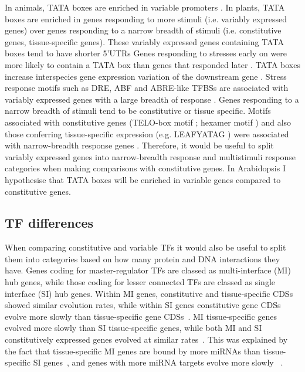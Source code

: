 \documentclass[../main.tex]{subfiles}
\begin{document}
In animals, TATA boxes are enriched in variable promoters \autocite{engstromGenomicRegulatoryBlocks2007,carninciGenomewideAnalysisMammalian2006}.
In plants, TATA boxes are enriched in genes responding to more stimuli (i.e. variably expressed genes) over genes responding to a narrow breadth of stimuli (i.e. constitutive genes, tissue-specific genes).
These variably expressed genes containing TATA boxes tend to have shorter 5'UTRs \autocite{waltherRegulatoryCodeTranscriptional2007,molinaGenomeWideAnalysis2005,lichtenbergWordLandscapeNoncoding2009}
Genes responding to stresses early on were more likely to contain a TATA box than genes that responded later \autocite{waltherRegulatoryCodeTranscriptional2007}.
TATA boxes increase interspecies gene expression variation of the downstream gene \autocite{tiroshGeneticSignatureInterspecies2006}.
Stress response motifs such as DRE, ABF and ABRE-like TFBSs \autocite{yamaguchi-shinozakiNovelCisactingElement1994} are associated with variably expressed genes with a large breadth of response \autocite{waltherRegulatoryCodeTranscriptional2007}.
Genes responding to a narrow breadth of stimuli tend to be constitutive or tissue specific.
Motifs associated with constitutive genes (TELO-box motif \autocite{tremousayguePlantInterstitialTelomere1999}; hexamer motif \autocite{chaubetIdentificationCiselementsRegulating1996}) and also those conferring tissue-specific expression (e.g. LEAFYATAG \autocite{kamiyaIsolationCharacterizationRice2003}) were associated with narrow-breadth response genes \autocite{waltherRegulatoryCodeTranscriptional2007}. Therefore, it would be useful to split variably expressed genes into narrow-breadth response and multistimuli response categories when making comparisons with constitutive genes.
In Arabidopsis I hypothesise that TATA boxes will be enriched in variable genes compared to constitutive genes.

\subsection{TF differences}

When comparing constitutive and variable TFs it would also be useful to split them into categories based on how many protein and DNA interactions they have.
Genes coding for master-regulator TFs are classed as multi\hyp{}interface (MI) hub genes, while those coding for lesser connected TFs are classed as single interface (SI) hub genes.
Within MI genes, constitutive and tissue-specific CDSs showed similar evolution rates, while within SI genes constitutive gene CDSs evolve more slowly than tissue-specific gene CDSs~\autocite{podderMultifunctionalityDominantlyDetermines2009}.
MI tissue-specific genes evolved more slowly than SI tissue-specific genes, while both MI and SI constitutively expressed genes evolved at similar rates~\autocite{biswasEvolutionaryRateHeterogeneity2018}.
This was explained by the fact that tissue-specific MI genes are bound by more miRNAs than tissue-specific SI genes~\autocite{biswasEvolutionaryRateHeterogeneity2018}, and genes with more miRNA targets evolve more slowly ~\autocite{chengRelationshipEvolutionMicroRNA2009}.
\end{document}
